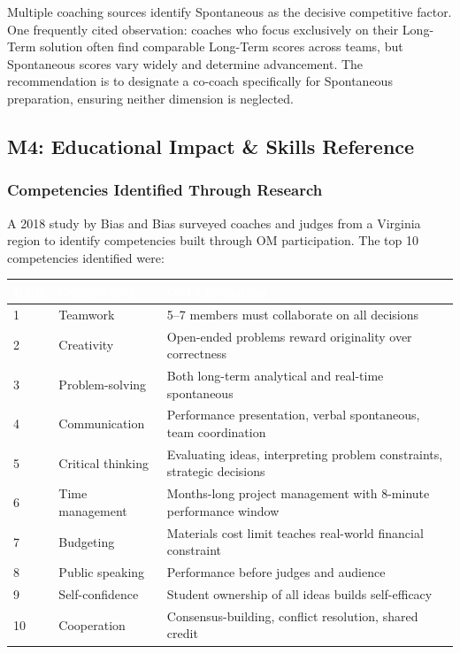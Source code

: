 \documentclass[11pt,letterpaper]{article}
\newcommand{\tableheader}[1]{\textbf{\sffamily\textcolor{white}{#1}}}
\begin{document}
Multiple coaching sources identify Spontaneous as the decisive competitive factor. One frequently cited observation: coaches who focus exclusively on their Long-Term solution often find comparable Long-Term scores across teams, but Spontaneous scores vary widely and determine advancement. The recommendation is to designate a co-coach specifically for Spontaneous preparation, ensuring neither dimension is neglected.

\subsection{M4: Educational Impact \& Skills Reference}

\subsubsection{Competencies Identified Through Research}

A 2018 study by Bias and Bias surveyed coaches and judges from a Virginia region to identify competencies built through OM participation. The top 10 competencies identified were:

\begin{center}
\begin{tabularx}{\textwidth}{C{1cm}L{4cm}X}
\toprule
{}
\tableheader{Rank} & \tableheader{Competency} & \tableheader{OM Mechanism} \\
 & Teamwork & 5--7 members must collaborate on all decisions \\
2 & Creativity & Open-ended problems reward originality over correctness \\
3 & Problem-solving & Both long-term analytical and real-time spontaneous \\
4 & Communication & Performance presentation, verbal spontaneous, team coordination \\
5 & Critical thinking & Evaluating ideas, interpreting problem constraints, strategic decisions \\
6 & Time management & Months-long project management with 8-minute performance window \\
7 & Budgeting & Materials cost limit teaches real-world financial constraint \\
8 & Public speaking & Performance before judges and audience \\
9 & Self-confidence & Student ownership of all ideas builds self-efficacy \\
10 & Cooperation & Consensus-building, conflict resolution, shared credit \\
\bottomrule
\end{tabularx}
\end{center}
\end{document}
